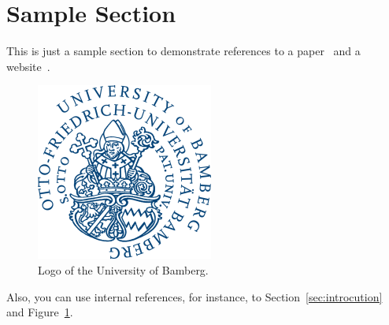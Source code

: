 \section{Sample Section}

This is just a sample section to demonstrate references to a paper~\cite{Shneiderman1996Eyes} and a website~\cite{wiki:BibTeX}.

\begin{figure}[tbp]
    \centering
    \includegraphics[width=0.3\linewidth]{figures/uni_ba_logo.png}
    \caption{Logo of the University of Bamberg.}
    \label{fig:uni_ba_logo}
\end{figure}

Also, you can use internal references, for instance, to Section~\ref{sec:introcution} and Figure~\ref{fig:uni_ba_logo}.

